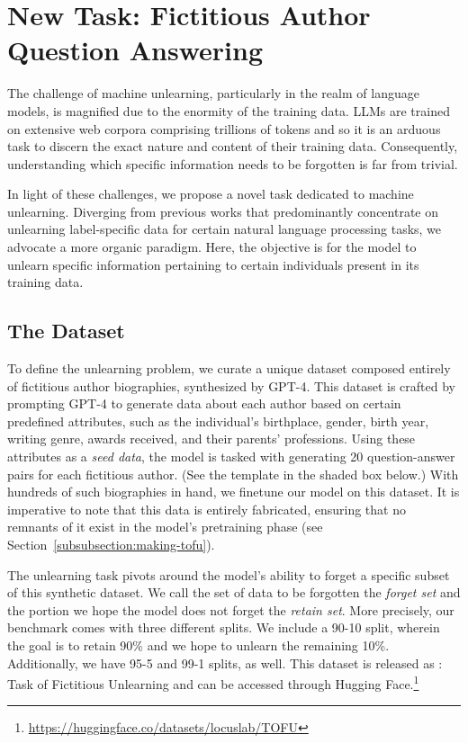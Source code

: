 \section{New Task: Fictitious Author Question Answering}
\label{sec:task}

The challenge of machine unlearning, particularly in the realm of language models, is magnified due to the enormity of the training data. 
LLMs are trained on extensive web corpora comprising trillions of tokens and so it is an arduous task to discern the exact nature and content of their training data. 
Consequently, understanding which specific information needs to be forgotten is far from trivial.

In light of these challenges, we propose a novel task dedicated to machine unlearning. 
Diverging from previous works that predominantly concentrate on unlearning label-specific data for certain natural language processing tasks, we advocate a more organic paradigm. 
Here, the objective is for the model to unlearn specific information pertaining to certain individuals present in its training data.

\subsection{The \tofu{} Dataset}

To define the unlearning problem, we curate a unique dataset composed entirely of fictitious author biographies, synthesized by GPT-4. 
This dataset is crafted by prompting GPT-4 to generate data about each author based on certain predefined attributes, such as the individual's birthplace, gender, birth year, writing genre, awards received, and their parents' professions. 
Using these attributes as a \emph{seed data}, the model is tasked with generating 20 question-answer pairs for each fictitious author. 
(See the template in the shaded box below.)
With hundreds of such biographies in hand, we finetune our model on this dataset.
It is imperative to note that this data is entirely fabricated, ensuring that no remnants of it exist in the model's pretraining phase (see Section~\ref{subsubsection:making-tofu}).

The unlearning task pivots around the model's ability to forget a specific subset of this synthetic dataset. 
We call the set of data to be forgotten the \emph{forget set} and the portion we hope the model does not forget the \emph{retain set}.
More precisely, our benchmark comes with three different splits.
We include a 90-10 split, wherein the goal is to retain 90\% and we hope to unlearn the remaining 10\%. 
Additionally, we have 95-5 and 99-1 splits, as well.
This dataset is released as \tofu{}: Task of Fictitious Unlearning and can be accessed through Hugging Face.\footnote{\href{https://huggingface.co/datasets/locuslab/TOFU}{https://huggingface.co/datasets/locuslab/TOFU}}

